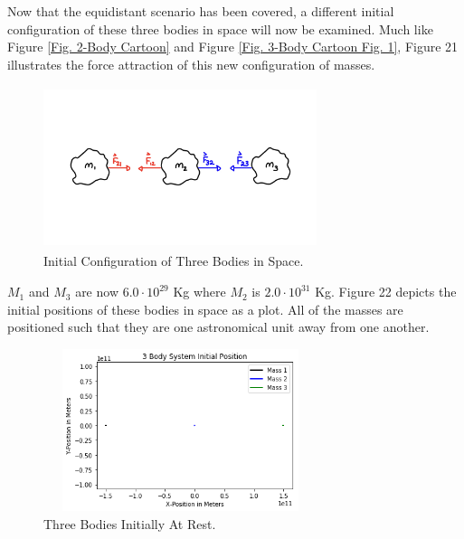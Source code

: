 \documentclass[twocolumn]{article}
\begin{document}
Now that the equidistant scenario has been covered, a different initial configuration of these three bodies in space will now be examined. Much like Figure \ref{Fig. 2-Body Cartoon} and Figure \ref{Fig. 3-Body Cartoon Fig. 1}, Figure 21 illustrates the force attraction of this new configuration of masses.
\begin{figure}[ht]
    \centering
    \includegraphics[width=8cm, height=4.75cm]{Figures/3-Body Cartoon (2).png}
    \caption{\small{Initial Configuration of Three Bodies in Space.}}
    \label{Fig. 3-Body Cartoon Fig. 2}
\end{figure}
\begin{center}
\end{center}
\newpage \noindent
$M_1$ and $M_3$ are now $6.0\cdot10^{29}$ Kg where $M_2$ is $2.0\cdot10^{31}$ Kg. Figure 22 depicts the initial positions of these bodies in space as a plot. All of the masses are positioned such that they are one astronomical unit away from one another. 
\begin{figure}[ht]
    \centering
    \includegraphics[width=8cm, height=4.75cm]{Figures/3-Body Dynamics (9).png}
    \caption{\small{Three Bodies Initially At Rest.}}
    \label{Fig. 3-Body Dynamics Fig. 9}
\end{figure}
\end{document}
